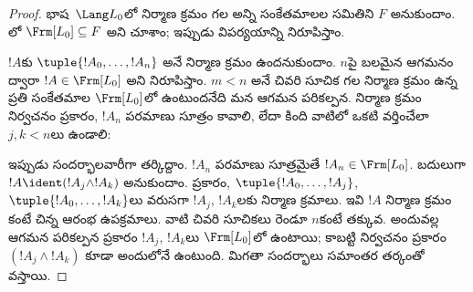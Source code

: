 \documentclass[../../../include/open-logic-section]{subfiles}
\begin{document}
\begin{proof}
భాష~$\Lang L_0$లో నిర్మాణ క్రమం గల అన్ని సంకేతమాలల సమితిని $F$
అనుకుందాం. లో
$\Frm[L_0] \subseteq F$ అని చూశాం; ఇప్పుడు విపర్యయాన్ని నిరూపిస్తాం.

$!A$కు $\tuple{!A_0,\dotsc,!A_n}$ అనే నిర్మాణ క్రమం ఉందనుకుందాం.
$n$పై బలమైన ఆగమనం ద్వారా $!A \in \Frm[L_0]$ అని నిరూపిస్తాం.
$m < n$ అనే చివరి సూచిక గల నిర్మాణ క్రమం ఉన్న ప్రతి సంకేతమాల
$\Frm[L_0]$లో ఉంటుందనేది మన ఆగమన పరికల్పన. నిర్మాణ క్రమం నిర్వచనం
ప్రకారం, $!A_n$ పరమాణు సూత్రం కావాలి, లేదా కింది వాటిలో ఒకటి వర్తించేలా
$j,k < n$లు ఉండాలి:
\begin{enumerate}
\end{enumerate}
ఇప్పుడు సందర్భాలవారీగా తర్కిద్దాం. $!A_n$ పరమాణు సూత్రమైతే
$!A_n \in \Frm[L_0]$. బదులుగా $!A \ident
(!A_j \land !A_k)$ అనుకుందాం.
 ప్రకారం,
$\tuple{!A_0,\dotsc,!A_j}$, $\tuple{!A_0,\dotsc,!A_k}$లు వరుసగా
$!A_j$, $!A_k$లకు నిర్మాణ క్రమాలు. ఇవి $!A$ నిర్మాణ క్రమం కంటే చిన్న
ఆరంభ ఉపక్రమాలు. వాటి చివరి సూచికలు రెండూ $n$కంటే తక్కువ. అందువల్ల ఆగమన
పరికల్పన ప్రకారం $!A_j$, $!A_k$లు $\Frm[L_0]$లో ఉంటాయి; కాబట్టి
 నిర్వచనం ప్రకారం $(!A_j \land !A_k)$ కూడా అందులోనే
ఉంటుంది. మిగతా సందర్భాలు సమాంతర తర్కంతో వస్తాయి.
\end{proof}
\end{document}
